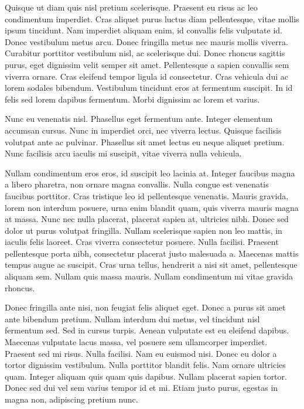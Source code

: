 Quisque ut diam quis nisl pretium scelerisque. Praesent eu risus ac leo condimentum imperdiet. Cras aliquet purus luctus diam pellentesque, vitae mollis ipsum tincidunt. Nam imperdiet aliquam enim, id convallis felis vulputate id. Donec vestibulum metus arcu. Donec fringilla metus nec mauris mollis viverra. Curabitur porttitor vestibulum nisl, ac scelerisque dui. Donec rhoncus sagittis purus, eget dignissim velit semper sit amet. Pellentesque a sapien convallis sem viverra ornare. Cras eleifend tempor ligula id consectetur. Cras vehicula dui ac lorem sodales bibendum. Vestibulum tincidunt eros at fermentum suscipit. In id felis sed lorem dapibus fermentum. Morbi dignissim ac lorem et varius.

Nunc eu venenatis nisl. Phasellus eget fermentum ante. Integer elementum accumsan cursus. Nunc in imperdiet orci, nec viverra lectus. Quisque facilisis volutpat ante ac pulvinar. Phasellus sit amet lectus eu neque aliquet pretium. Nunc facilisis arcu iaculis mi suscipit, vitae viverra nulla vehicula.

Nullam condimentum eros eros, id suscipit leo lacinia at. Integer faucibus magna a libero pharetra, non ornare magna convallis. Nulla congue est venenatis faucibus porttitor. Cras tristique leo id pellentesque venenatis. Mauris gravida, lorem non interdum posuere, urna enim blandit quam, quis viverra mauris magna at massa. Nunc nec nulla placerat, placerat sapien at, ultricies nibh. Donec sed dolor ut purus volutpat fringilla. Nullam scelerisque sapien non leo mattis, in iaculis felis laoreet. Cras viverra consectetur posuere. Nulla facilisi. Praesent pellentesque porta nibh, consectetur placerat justo malesuada a. Maecenas mattis tempus augue ac suscipit. Cras urna tellus, hendrerit a nisi sit amet, pellentesque aliquam sem. Nullam quis massa mauris. Nullam condimentum mi vitae gravida rhoncus.

Donec fringilla ante nisi, non feugiat felis aliquet eget. Donec a purus sit amet ante bibendum pretium. Nullam interdum dui metus, vel tincidunt nisl fermentum sed. Sed in cursus turpis. Aenean vulputate est eu eleifend dapibus. Maecenas vulputate lacus massa, vel posuere sem ullamcorper imperdiet. Praesent sed mi risus. Nulla facilisi. Nam eu euismod nisi. Donec eu dolor a tortor dignissim vestibulum. Nulla porttitor blandit felis. Nam ornare ultricies quam. Integer aliquam quis quam quis dapibus. Nullam placerat sapien tortor. Donec sed dui vel sem varius tempor id et mi. Etiam justo purus, egestas in magna non, adipiscing pretium nunc.

